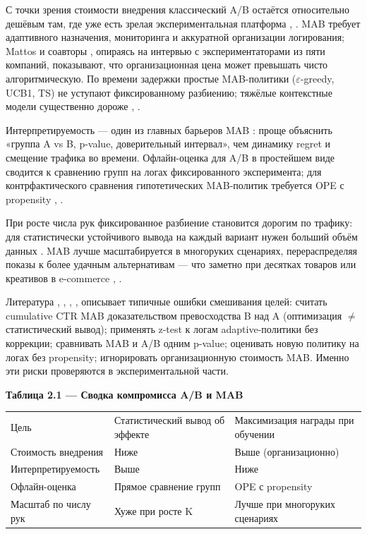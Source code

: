 С точки зрения стоимости внедрения классический A/B остаётся относительно дешёвым там, где уже есть зрелая экспериментальная платформа \cite{ref5}, \cite{ref20}. MAB требует адаптивного назначения, мониторинга и аккуратной организации логирования; Mattos и соавторы \cite{ref18}, опираясь на интервью с экспериментаторами из пяти компаний, показывают, что организационная цена может превышать чисто алгоритмическую. По времени задержки простые MAB-политики ($\varepsilon$-greedy, UCB1, TS) не уступают фиксированному разбиению; тяжёлые контекстные модели существенно дороже \cite{ref15}, \cite{ref16}.

Интерпретируемость --- один из главных барьеров MAB \cite{ref18}: проще объяснить «группа A vs B, p-value, доверительный интервал», чем динамику regret и смещение трафика во времени. Офлайн-оценка для A/B в простейшем виде сводится к сравнению групп на логах фиксированного эксперимента; для контрфактического сравнения гипотетических MAB-политик требуется OPE с propensity \cite{ref6}, \cite{ref24}.

При росте числа рук фиксированное разбиение становится дорогим по трафику: для статистически устойчивого вывода на каждый вариант нужен больший объём данных \cite{ref5}. MAB лучше масштабируется в многоруких сценариях, перераспределяя показы к более удачным альтернативам \cite{ref13} --- что заметно при десятках товаров или креативов в e-commerce \cite{ref21}, \cite{ref26}.

Литература \cite{ref11}, \cite{ref12}, \cite{ref19}, \cite{ref21}, \cite{ref22} описывает типичные ошибки смешивания целей: считать cumulative CTR MAB доказательством превосходства B над A (оптимизация $\neq$ статистический вывод); применять z-test к логам adaptive-политики без коррекции; сравнивать MAB и A/B одним p-value; оценивать новую политику на логах без propensity; игнорировать организационную стоимость MAB. Именно эти риски проверяются в экспериментальной части.

\textbf{Таблица 2.1 --- Сводка компромисса A/B и MAB}

\begingroup\footnotesize\setlength{\tabcolsep}{4pt}
\begin{xltabular}{\linewidth}{@{}
  >{\raggedright\arraybackslash}Y
  >{\raggedright\arraybackslash}Y
  >{\raggedright\arraybackslash}Y@{}}
\toprule\noalign{}
\midrule\noalign{}
\endhead
\bottomrule\noalign{}
\endlastfoot
Цель & Статистический вывод об эффекте & Максимизация награды при обучении \\
Стоимость внедрения & Ниже & Выше (организационно) \\
Интерпретируемость & Выше & Ниже \\
Офлайн-оценка & Прямое сравнение групп & OPE с propensity \\
Масштаб по числу рук & Хуже при росте K & Лучше при многоруких сценариях \\
\end{xltabular}
\endgroup

